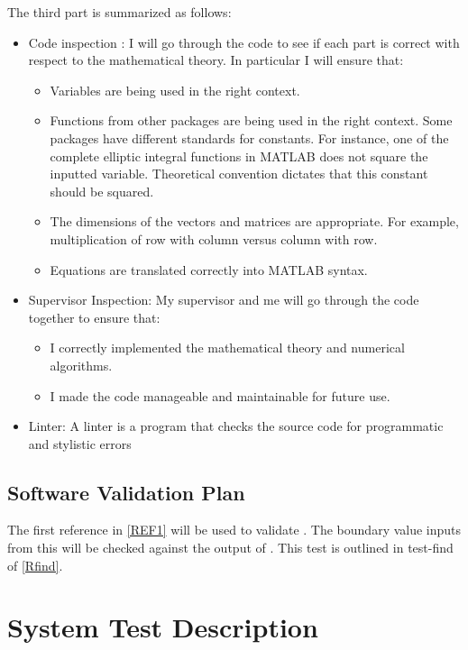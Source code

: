 \documentclass[12pt, titlepage]{article}
\begin{document}
The third part is summarized as follows: 
 \label{staticVertech}
 \begin{itemize}
 	\item Code inspection : I will 
 	go through the code to see if each part is correct with respect to the
 	mathematical theory. In particular I will ensure that: 
 	\begin{itemize}
 		\item Variables are being used in the right context. 
 		\item Functions from other packages are being used in the right 
 		context. Some packages have different standards for 
 		constants. For instance, one of the complete elliptic integral 
 		functions in MATLAB does not square the inputted variable. Theoretical 
 		convention dictates that this constant should be squared. 
 		\item The dimensions of the vectors and matrices are appropriate. For 
 		example, multiplication of row with column versus column with row.
 		\item Equations are translated correctly into MATLAB syntax.  
 	\end{itemize} 
 	\item Supervisor Inspection: My supervisor and me will go through the code 
 	together to ensure that: 
 	\begin{itemize}
 		\item I correctly implemented the mathematical theory and numerical 
 		algorithms.
 		\item I made the code manageable and maintainable for future use.
 	\end{itemize} 
 	
 	\item Linter: A linter is a program that checks the source code for 
 	programmatic and stylistic errors
 \end{itemize}

\subsection{Software Validation Plan}
\label{SoftwareValidationPlan}
The first reference in \ref{REF1} will be used to validate \progname. The 
boundary value inputs from this will be checked against the output of 
\progname. This test is outlined in test-find of \ref{Rfind}. 

\newpage
\section{System Test Description}
	
\end{document}
